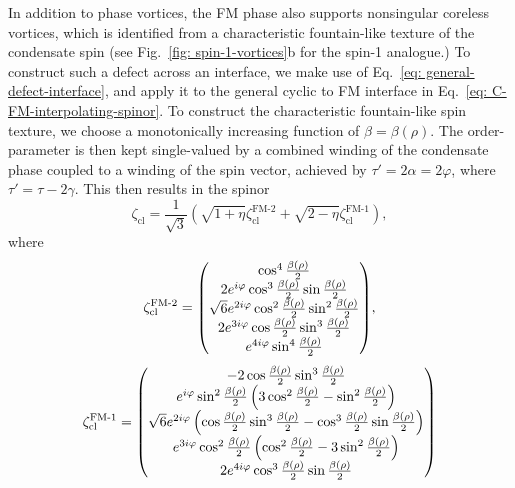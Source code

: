 In addition to phase vortices, the FM phase also supports nonsingular coreless
vortices, which is identified from a characteristic fountain-like texture of
the condensate spin (see Fig.~\ref{fig: spin-1-vortices}b for the spin-1
analogue.)
To construct such a defect across an interface, we make use of
Eq.~\eqref{eq: general-defect-interface}, and apply it to the general cyclic to
FM interface in Eq.~\eqref{eq: C-FM-interpolating-spinor}.
To construct the characteristic fountain-like spin texture, we choose a
monotonically increasing function of \(\beta=\beta(\rho)\).
The order-parameter is then kept single-valued by a combined winding of the
condensate phase coupled to a winding of the spin vector, achieved by
\(\tau'=2\alpha=2\varphi \), where \(\tau'=\tau-2\gamma \).
This then results in the spinor
\begin{equation}\label{eq: C-FM-coreless-general}
    \zeta_\text{cl} = \frac{1}{\sqrt{3}}\left(
        \sqrt{1 + \eta}\zeta^\text{FM-2}_\text{cl}
        + \sqrt{2 - \eta}\zeta^\text{FM-1}_\text{cl}\right),
\end{equation}
where
\begin{align}\label{eq: C-FM-coreless-FM-limits}
    \zeta^\text{FM-2}_\text{cl} =
    \mqty(
    \cos^4\frac{\beta(\rho)}{2}                                        \\
    2e^{i\varphi}\cos^3\frac{\beta(\rho)}{2}\sin\frac{\beta(\rho)}{2}  \\
    \sqrt{6}e^{2i\varphi}\cos^2\frac{\beta(\rho)}{2}\sin^2
    \frac{\beta(\rho)}{2}                                              \\
    2e^{3i\varphi}\cos\frac{\beta(\rho)}{2}\sin^3\frac{\beta(\rho)}{2} \\
    e^{4i\varphi}\sin^4\frac{\beta(\rho)}{2}
    ),
\end{align}
\begin{align}
    \zeta^\text{FM-1}_\text{cl} =
    \mqty(
    -2\cos\frac{\beta(\rho)}{2}\sin^3\frac{\beta(\rho)}{2}         \\
    e^{i\varphi}\sin^2\frac{\beta(\rho)}{2}\left(3\cos^2
    \frac{\beta(\rho)}{2}-\sin^2\frac{\beta(\rho)}{2}\right)       \\
    \sqrt{6}e^{2i\varphi}\left(\cos\frac{\beta(\rho)}{2}\sin^3
    \frac{\beta(\rho)}{2}
    - \cos^3\frac{\beta(\rho)}{2}\sin\frac{\beta(\rho)}{2} \right) \\
    e^{3i\varphi}\cos^2\frac{\beta(\rho)}{2}\left(\cos^2
    \frac{\beta(\rho)}{2}-3\sin^2\frac{\beta(\rho)}{2}\right)      \\
    2e^{4i\varphi}\cos^3\frac{\beta(\rho)}{2}\sin\frac{\beta(\rho)}{2}
    )
\end{align}
